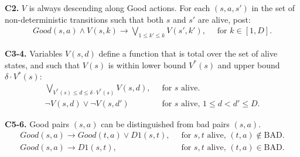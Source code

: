 \documentclass[a4paper]{article}
\newcommand{\smallpar}[1]{{\vspace{10pt}\noindent \bf #1.}}
\newcommand{\badtx}{\ensuremath{\mathrm{BAD}}}
\begin{document}
\smallpar{C2} $V$ is always descending along Good actions. For each $(s, a, s')$ in the set of non-deterministic transitions
such that both $s$ and $s'$ are alive, post:
\begin{align}
 Good(s, a) \land V(s, k) \rightarrow \bigvee_{1 \leq k' \leq k} V(s', k'),&\;\; \text{for } k \in [1, D].
\end{align}




\smallpar{C3-4}
Variables $V(s, d)$ define a function that is total over the set of alive states,
and such that $V(s)$ is within lower bound $V^*(s)$ and upper bound $\delta \cdot V^*(s)$:
\begin{align}
 \bigvee_{V^*(s) \leq d \leq \delta \cdot V^*(s)} V(s,d),&\;\; \text{for $s$ alive.} \\
 \neg V(s, d) \lor \neg V(s, d')&\;\; \text{for $s$ alive, $1 \leq d < d' \leq D$.}
\end{align}

\smallpar{C5-6}
Good pairs $(s, a)$ can be distinguished from bad pairs $(s, a)$.
\begin{align}
 Good(s, a) \rightarrow Good(t, a) \lor
 D1(s, t),&\;\; \text{for $s, t$ alive, $(t, a) \not\in \badtx$.} \\
 Good(s, a) \rightarrow D1(s, t),&\;\; \text{for $s, t$ alive, $(t, a) \in \badtx$.}
\end{align}
\end{document}
